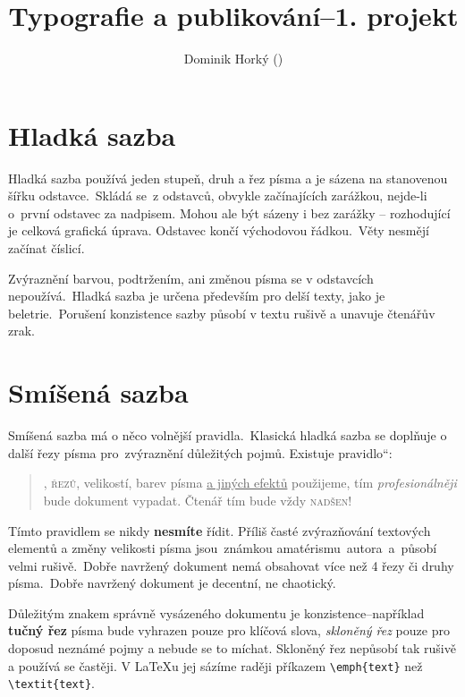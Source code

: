 \documentclass[twocolumn, 10pt]{article}
\date{}
\title{Typografie a publikování\hspace{1mm}--\hspace{1mm}1. projekt
\vspace{0.1cm}}
\author{Dominik Horký (\email{xhorky32@stud.fit.vutbr.cz})}
\newcommand{\uv}[1]{\quotedblbase #1\textquotedblleft}
\begin{document}
\maketitle

\section{Hladká sazba}

Hladká sazba používá jeden stupeň, druh a řez písma a je sázena na stanovenou šířku odstavce.\ Skládá se~z odstavců, obvykle začínajících zarážkou, nejde-li o~první odstavec za nadpisem. Mohou ale být sázeny i bez zarážky -- rozhodující je celková grafická úprava. Odstavec končí východovou řádkou.\ Věty nesmějí začínat číslicí.

Zvýraznění barvou, podtržením, ani změnou písma se v odstavcích nepoužívá.\ Hladká sazba je určena především pro delší texty, jako je beletrie.\ Porušení konzistence sazby působí v textu rušivě a unavuje čtenářův zrak.

\section{Smíšená sazba}

Smíšená sazba má o něco volnější pravidla.\ Klasická hladká sazba se doplňuje o další řezy písma pro~zvýraznění důležitých pojmů. Existuje \uv{pravidlo}:
\begin{quote}

\hspace*{0.4cm} {},
\textsc{řezů},
{\tiny velikostí},
barev písma \underline{a jiných efektů}
použijeme, tím \textit{\large{profesionálněji}}
bude dokument vypadat. Čtenář tím bude vždy \textsc{nadšen}!

\end{quote}

{\footnotesize Tímto} pravidlem se nikdy \textbf{nesmíte} řídit. Příliš časté {\large zvýrazňování} textových elementů a změny velikosti {\huge písma} jsou~známkou amatérismu~autora~a~působí\\{\Huge velmi} rušivě.\ Dobře navržený dokument nemá obsahovat více než
4 řezy či druhy písma.\ Dobře navržený dokument je decentní, ne chaotický.

Důležitým znakem správně vysázeného dokumentu je konzistence\hspace{0.8mm}--\hspace{0.8mm}například \textbf{tučný řez} písma bude vyhrazen pouze pro klíčová slova, \textit{skloněný řez} pouze pro doposud neznámé pojmy a nebude se to míchat. Skloněný řez nepůsobí tak rušivě a používá se častěji. V \LaTeX u jej sázíme raději příkazem \verb|\emph{text}| než \verb|\textit{text}|.
\end{document}
